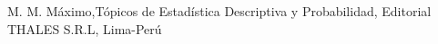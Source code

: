 
        \begin{thebibliography}{10}
             M. M. Máximo,Tópicos de Estadística Descriptiva y Probabilidad, Editorial THALES S.R.L, Lima-Perú
            \bibitem{} 
        \end{thebibliography}